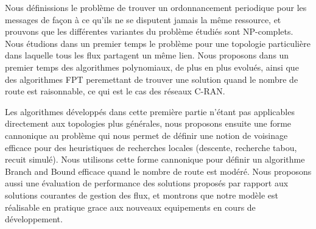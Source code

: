 \begin{mdframed}[linecolor=Prune,linewidth=1]
\begin{small}
\begin{multicols}{2}
Nous définissions le problème de trouver un ordonnancement periodique pour les messages de façon à ce qu'ils ne se disputent jamais la même ressource, et prouvons que les différentes variantes du problème étudiés sont NP-complets. Nous étudions dans un premier temps le problème pour une topologie particulière dans laquelle tous les flux partagent un même lien. Nous proposons dans un premier temps des algorithmes polynomiaux, de plus en plus evolués, ainsi que des algorithmes FPT peremettant de trouver une solution quand le nombre de route est raisonnable, ce qui est le cas des réseaux C-RAN.

Les algorithmes développés dans cette première partie n’étant pas applicables directement aux topologies plus générales, nous proposons ensuite une forme cannonique au problème qui nous permet de définir une notion de voisinage efficace pour des heuristiques de recherches locales (descente, recherche tabou, recuit simulé). Nous utilisons cette forme cannonique pour définir un algorithme Branch and Bound efficace quand le nombre de route est modéré.
Nous proposons aussi une évaluation de performance des solutions proposés par rapport aux solutions courantes de gestion des flux, et montrons que notre modèle est réalisable en pratique grace aux nouveaux equipements en cours de développement.
\end{multicols}
\end{small}
\end{mdframed}


